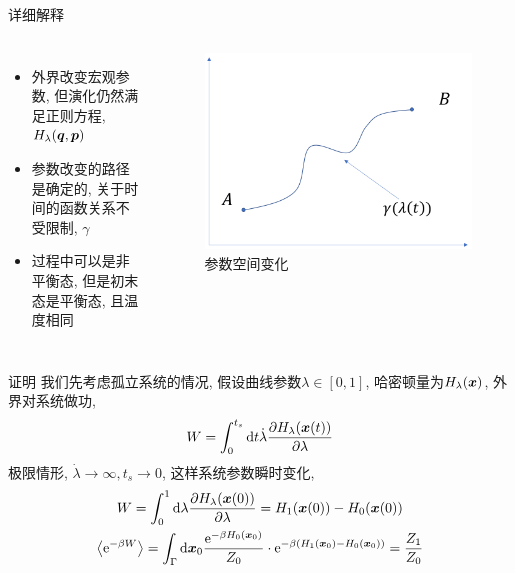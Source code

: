 \documentclass[aspectratio=169]{wzbeamer}
\begin{document}
    \begin{frame}{详细解释}
        \begin{columns}
            \begin{itemize}
                \item 外界改变宏观参数, 但演化仍然满足正则方程, $H_\lambda(\vb*q,\vb*p)$
                \item 参数改变的路径是确定的, 关于时间的函数关系不受限制, $\gamma$
                \item 过程中可以是非平衡态, 但是初末态是平衡态, 且温度相同
            \end{itemize}
            \begin{figure}[H
                ]
                \centering
                \includegraphics[width=\textwidth]{parameter.png}
                \caption{参数空间变化}
            \end{figure}
        \end{columns}
    \end{frame}
    \begin{frame}{证明}
        我们先考虑孤立系统的情况, 假设曲线参数$\lambda\in[0,1]$, 哈密顿量为$H_\lambda(\vb*x)$, 外界对系统做功,
        \begin{equation}
            W = \int_0^{t_s} \dd t \dot\lambda \pdv{H_\lambda(\vb*x(t))}{\lambda}
        \end{equation}
        极限情形, $\dot\lambda \to \infty, t_s\to 0$, 这样系统参数瞬时变化, 
        \begin{gather*}
            W = \int_0^1 \dd\lambda\pdv{H_\lambda(\vb*x(0))}{\lambda} = H_1(\vb*x(0)) - H_0(\vb*x(0)) \\
            \expval{\mathrm{e}^{-\beta W}} = \int_\Gamma\dd\vb*x_0 \dfrac{\mathrm{e}^{-\beta H_0(\vb*x_0)}}{Z_0} \cdot \mathrm{e}^{-\beta (H_1(\vb*x_0) - H_0(\vb*x_0))} = \frac{Z_1}{Z_0}
        \end{gather*}
    \end{frame}
\end{document}
